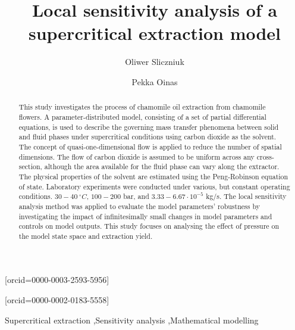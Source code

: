 \documentclass[a4paper,fleqn]{cas-dc}
\begin{document}
 

\title[mode=title]{Local sensitivity analysis of a supercritical extraction model}                      


\author[1]{Oliwer Sliczniuk}[orcid=0000-0003-2593-5956]
\cormark[1]

\author[1]{Pekka Oinas}[orcid=0000-0002-0183-5558]


\address[1]{Aalto University, School of Chemical Engineering, Espoo, 02150, Finland}


\begin{abstract}
This study investigates the process of chamomile oil extraction from chamomile flowers. A parameter-distributed model, consisting of a set of partial differential equations, is used to describe the governing mass transfer phenomena between solid and fluid phases under supercritical conditions using carbon dioxide as the solvent. The concept of quasi-one-dimensional flow is applied to reduce the number of spatial dimensions. The {\color{blue}flow of carbon dioxide} is assumed to be uniform across any cross-section, although the area available for the fluid phase can vary along the extractor. The physical properties of the solvent are estimated using the Peng-Robinson equation of state. Laboratory experiments were conducted under various, but constant operating conditions. $30 - 40~^\circ C$, $100 - 200$ bar, and $3.33-6.67 \cdot 10^{-5}$ kg/s. {\color{blue}The local sensitivity analysis method was applied to evaluate the model parameters' robustness by investigating the impact of infinitesimally small changes in model parameters and controls on model outputs}. This study focuses on analysing the effect of pressure on the model state space and extraction yield.

\end{abstract}

\begin{keywords}
Supercritical extraction \sep Sensitivity analysis \sep Mathematical modelling
\end{keywords}
\end{document}

